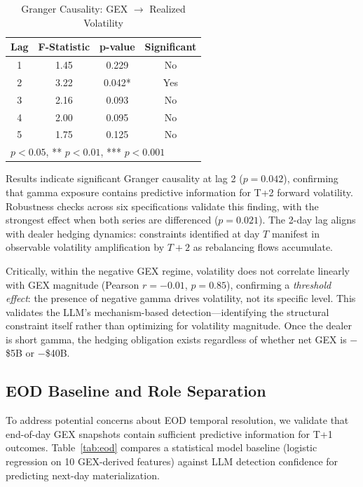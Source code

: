 \begin{table}[!htbp]
\centering
\caption{Granger Causality: GEX $\rightarrow$ Realized Volatility}
\label{tab:granger}
\small
\begin{tabular}{@{}cccc@{}}
\toprule
\textbf{Lag} & \textbf{F-Statistic} & \textbf{p-value} & \textbf{Significant} \\
\midrule
1 & 1.45 & 0.229 & No \\
2 & 3.22 & 0.042* & Yes \\
3 & 2.16 & 0.093 & No \\
4 & 2.00 & 0.095 & No \\
5 & 1.75 & 0.125 & No \\
\bottomrule
\multicolumn{4}{l}{\footnotesize * $p < 0.05$, ** $p < 0.01$, *** $p < 0.001$}
\end{tabular}
\end{table}

Results indicate significant Granger causality at lag 2 ($p = 0.042$), confirming that gamma exposure contains predictive information for T+2 forward volatility. Robustness checks across six specifications validate this finding, with the strongest effect when both series are differenced ($p = 0.021$). The 2-day lag aligns with dealer hedging dynamics: constraints identified at day $T$ manifest in observable volatility amplification by $T+2$ as rebalancing flows accumulate.

Critically, within the negative GEX regime, volatility does not correlate linearly with GEX magnitude (Pearson $r = -0.01$, $p = 0.85$), confirming a \textit{threshold effect}: the presence of negative gamma drives volatility, not its specific level. This validates the LLM's mechanism-based detection---identifying the structural constraint itself rather than optimizing for volatility magnitude. Once the dealer is short gamma, the hedging obligation exists regardless of whether net GEX is $-$\$5B or $-$\$40B.

\subsection{EOD Baseline and Role Separation}
\label{subsec:eod}

To address potential concerns about EOD temporal resolution, we validate that end-of-day GEX snapshots contain sufficient predictive information for T+1 outcomes. Table~\ref{tab:eod} compares a statistical model baseline (logistic regression on 10 GEX-derived features) against LLM detection confidence for predicting next-day materialization.

